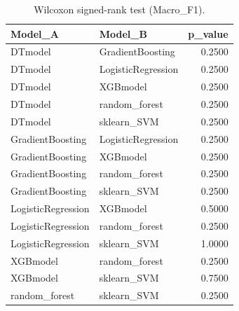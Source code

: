 \begin{table}[t]
\centering
\begin{tabular}{llr}
\toprule
Model_A & Model_B & p_value \\
\midrule
DTmodel & GradientBoosting & 0.2500 \\
DTmodel & LogisticRegression & 0.2500 \\
DTmodel & XGBmodel & 0.2500 \\
DTmodel & random_forest & 0.2500 \\
DTmodel & sklearn_SVM & 0.2500 \\
GradientBoosting & LogisticRegression & 0.2500 \\
GradientBoosting & XGBmodel & 0.2500 \\
GradientBoosting & random_forest & 0.2500 \\
GradientBoosting & sklearn_SVM & 0.2500 \\
LogisticRegression & XGBmodel & 0.5000 \\
LogisticRegression & random_forest & 0.2500 \\
LogisticRegression & sklearn_SVM & 1.0000 \\
XGBmodel & random_forest & 0.2500 \\
XGBmodel & sklearn_SVM & 0.7500 \\
random_forest & sklearn_SVM & 0.2500 \\
\bottomrule
\end{tabular}
\caption{Wilcoxon signed-rank test (Macro_F1).}
\label{tab:wilcoxon_Macro_F1}
\end{table}